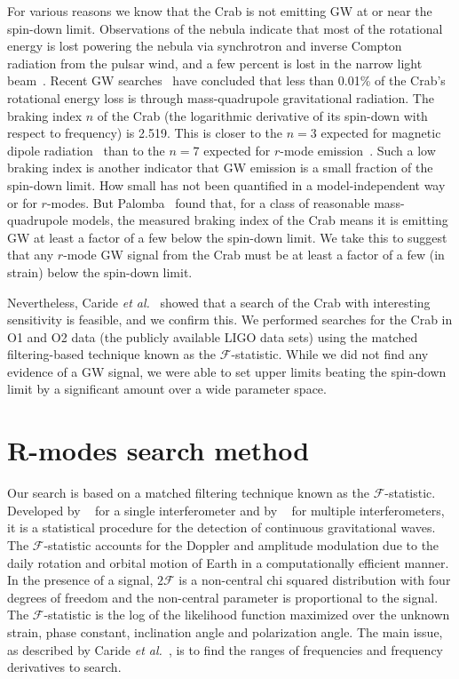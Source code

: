 \documentclass{ttuthes2007}
\begin{document}
For various reasons we know that the Crab is not emitting \ac{GW} at or near the
spin-down limit. Observations of the nebula indicate that most of the
rotational energy is lost powering the nebula via synchrotron and inverse
Compton radiation from the pulsar wind, and a few percent is lost in the narrow
light beam~\cite{B_hler_2014}. Recent \ac{GW} searches~\cite{Abbott_2019, O3}
have concluded that less than 0.01\% of the Crab's rotational energy loss is
through mass-quadrupole gravitational radiation. The braking index $n$ of the
Crab (the logarithmic derivative of its spin-down with respect to frequency) is
2.519.  This is closer to the $n=3$ expected for magnetic dipole
radiation~\cite{Lyne_2014} than to the $n=7$ expected for $r$-mode
emission~\cite{Owen_1998}. Such a low braking index is another indicator that
\ac{GW} emission is a small fraction of the spin-down limit. How small has not
been quantified in a model-independent way or for $r$-modes. But
Palomba~\cite{Palomba2000} found that, for a class of reasonable mass-quadrupole
models, the measured braking index of the Crab means it is emitting \ac{GW} at
least a factor of a few below the spin-down limit. We take this to suggest that
any $r$-mode \ac{GW} signal from the Crab must be at least a factor of a few (in
strain) below the spin-down limit.

Nevertheless, Caride \textit{et al.}~\cite{PhysRevD.100.064013} showed that a search of
the Crab with interesting sensitivity is feasible, and we confirm this.
We performed searches for the Crab in \ac{O1} and \ac{O2} data (the publicly
available LIGO data sets) using the matched filtering-based technique known as
the $\mathcal{F}$-statistic.
While we did not find any evidence of a \ac{GW} signal, we were able to set
upper limits beating the spin-down limit by a significant amount over a wide
parameter space.

\section{R-modes search method} 

Our search is based on a matched filtering technique  known as the 
$\mathcal{F}$-statistic. Developed by ~\citet{Jaranowski_1998} for a single interferometer and by
~\citet{PhysRevD.72.063006} for multiple interferometers, it is a statistical procedure
for the detection of continuous gravitational waves. The
$\mathcal{F}$-statistic accounts for the Doppler and amplitude modulation due
to the daily rotation and orbital motion of Earth in a computationally efficient
manner. In the presence of a signal,
$2\mathcal{F}$ is a non-central chi squared distribution with four degrees
of freedom and the non-central parameter is proportional to the signal. The
$\mathcal{F}$-statistic is the log of the likelihood function maximized over the
unknown strain, phase constant, inclination angle and polarization angle. 
The main issue, as described by Caride \textit{et al.}~\cite{PhysRevD.100.064013}, is to
find the ranges of frequencies and frequency derivatives to search.
\end{document}
